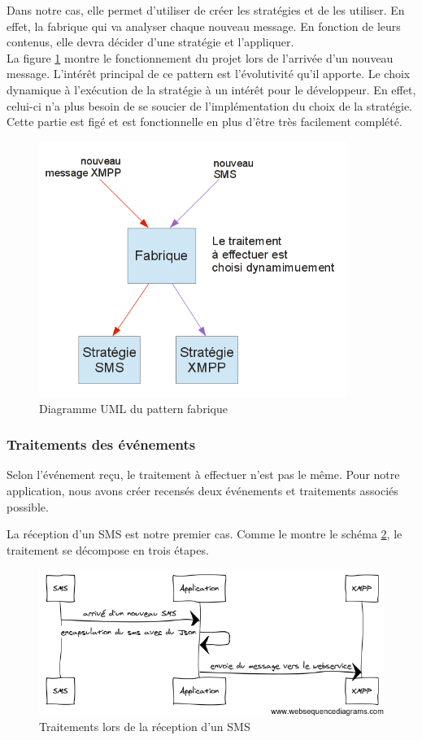 Dans notre cas, elle permet d'utiliser de créer les stratégies et de les utiliser. En effet, la fabrique 
qui va analyser chaque nouveau message. En fonction de leurs contenus, elle devra décider d'une stratégie
et l'appliquer.
\\

La figure \ref{fonctionnement-strategie-factorie} montre le fonctionnement du projet lors de l'arrivée d'un
nouveau message. L'intérêt principal de ce pattern est l'évolutivité qu'il apporte. Le choix dynamique à
l'exécution de la stratégie à un intérêt pour le développeur. En effet, celui-ci n'a plus besoin de se
soucier de l'implémentation du choix de la stratégie. Cette partie est figé et est fonctionnelle en plus d'être très facilement complété.

\begin{figure}[H]
	\center
	\includegraphics[width=10cm]{img/fonctionnement-strategie-factorie.png}
	\caption{Diagramme UML du pattern fabrique}
	\label{fonctionnement-strategie-factorie}
\end{figure}


\subsubsection{Traitements des événements}

Selon l’événement reçu, le traitement à effectuer n'est pas le même. Pour notre application, nous avons 
créer recensés deux événements et traitements associés possible.

La réception d'un SMS est notre premier cas. Comme le montre le schéma \ref{encapsulation-sms}, le traitement se 
décompose en trois étapes. 

\begin{figure}[!h]
	\center
	\includegraphics[width=12cm]{img/encapsulation-sms.png}
	\caption{Traitements lors de la réception d'un SMS}
	\label{encapsulation-sms}
\end{figure}

